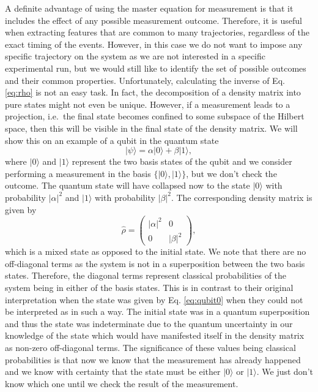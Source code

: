 A definite advantage of using the master equation for measurement is
that it includes the effect of any possible measurement
outcome. Therefore, it is useful when extracting features that are
common to many trajectories, regardless of the exact timing of the
events. However, in this case we do not want to impose any specific
trajectory on the system as we are not interested in a specific
experimental run, but we would still like to identify the set of
possible outcomes and their common properties. Unfortunately,
calculating the inverse of Eq. \eqref{eq:rho} is not an easy task. In
fact, the decomposition of a density matrix into pure states might not
even be unique. However, if a measurement leads to a projection,
i.e.~the final state becomes confined to some subspace of the Hilbert
space, then this will be visible in the final state of the density
matrix. We will show this on an example of a qubit in the quantum
state
\begin{equation}
  \label{eq:qubit0}
  | \psi \rangle = \alpha |0 \rangle + \beta | 1 \rangle,
\end{equation}
where $| 0 \rangle$ and $| 1 \rangle$ represent the two basis states
of the qubit and we consider performing a measurement in the basis
$\{| 0 \rangle, | 1 \rangle \}$, but we don't check the outcome.  The
quantum state will have collapsed now to the state $ | 0 \rangle$ with
probability $| \alpha |^2$ and $| 1 \rangle$ with probability
$| \beta |^2$. The corresponding density matrix is given by
\begin{equation}
  \label{eq:rho1}
  \hat{\rho} = \left( \begin{array}{cc}
                        | \alpha |^2 & 0 \\
                        0 & |\beta|^2 
                      \end{array} \right),
\end{equation}
which is a mixed state as opposed to the initial state. We note that
there are no off-diagonal terms as the system is not in a
superposition between the two basis states. Therefore, the diagonal
terms represent classical probabilities of the system being in either
of the basis states. This is in contrast to their original
interpretation when the state was given by Eq. \eqref{eq:qubit0} when
they could not be interpreted as in such a way. The initial state was
in a quantum superposition and thus the state was indeterminate due to
the quantum uncertainty in our knowledge of the state which would have
manifested itself in the density matrix as non-zero off-diagonal
terms. The significance of these values being classical probabilities
is that now we know that the measurement has already happened and we
know with certainty that the state must be either $| 0 \rangle$ or
$| 1 \rangle$. We just don't know which one until we check the result
of the measurement.

